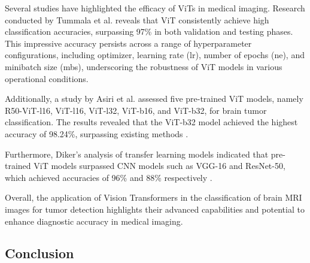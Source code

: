 Several studies have highlighted the efficacy of ViTs in medical imaging. Research conducted by Tummala et al. \cite{Tummala2022} reveals that ViT consistently achieve high classification accuracies, surpassing 97\% in both validation and testing phases. This impressive accuracy persists across a range of hyperparameter configurations, including optimizer, learning rate (lr), number of epochs (ne), and minibatch size (mbs), underscoring the robustness of ViT models in various operational conditions.

Additionally, a study by Asiri et al. assessed five pre-trained ViT models, namely R50-ViT-l16, ViT-l16, ViT-l32, ViT-b16, and ViT-b32, for brain tumor classification. The results revealed that the ViT-b32 model achieved the highest accuracy of 98.24\%, surpassing existing methods \cite{Asiri2023Advancing}. 

Furthermore, Diker's analysis of transfer learning models indicated that pre-trained ViT models surpassed CNN models such as VGG-16 and ResNet-50, which achieved accuracies of 96\% and 88\% respectively \cite{Diker2021A}.

Overall, the application of Vision Transformers in the classification of brain MRI images for tumor detection highlights their advanced capabilities and potential to enhance diagnostic accuracy in medical imaging.


\subsection{Conclusion}


